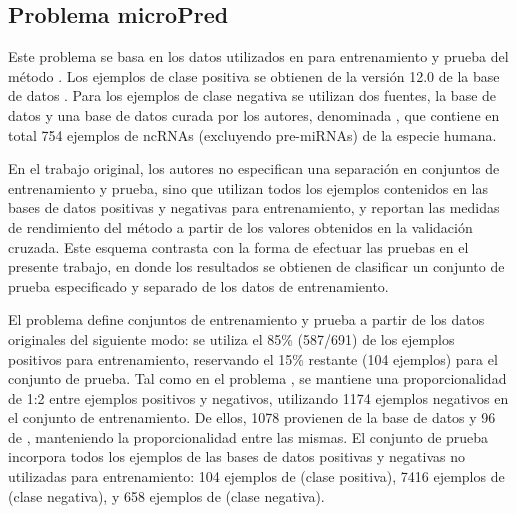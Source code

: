 %
%
\subsection{Problema microPred}
%
Este problema se basa en los datos utilizados en \cite{batuwita} para
entrenamiento y prueba del método .
Los ejemplos de clase positiva se obtienen de la versión 12.0 de la
base de datos .
Para los ejemplos de clase negativa se utilizan dos fuentes, la base
de datos  y una base de datos curada por los autores,
denominada , que contiene en total 754
ejemplos de ncRNAs (excluyendo pre-miRNAs) de la especie humana.

En el trabajo original, los autores no especifican una separación
en conjuntos de entrenamiento y prueba, sino que utilizan todos los
ejemplos contenidos en las bases de datos positivas y negativas para
entrenamiento, y reportan las medidas de rendimiento del método
a partir de los valores obtenidos en la validación cruzada.
Este esquema contrasta con la forma de efectuar las pruebas en el
presente trabajo, en donde los resultados se obtienen de clasificar un
conjunto de prueba especificado y separado de los datos de entrenamiento.

El problema \micropred{} define conjuntos de entrenamiento y prueba
a partir de los datos originales del siguiente modo:
se utiliza el 85\% (587/691) de los ejemplos positivos para
entrenamiento, reservando el 15\% restante (104 ejemplos) para el
conjunto de prueba.
Tal como en el problema , se mantiene una proporcionalidad
de 1:2 entre ejemplos positivos y negativos, utilizando 1174 ejemplos
negativos en el conjunto de entrenamiento.
De ellos, 1078 provienen de la base de datos  y 96 de
, manteniendo la proporcionalidad entre
las mismas.
El conjunto de prueba incorpora todos los ejemplos de las bases de
datos positivas y negativas no utilizadas para entrenamiento:
104 ejemplos de  (clase positiva), 7416 ejemplos de
 (clase negativa), y 658 ejemplos de  (clase negativa).
